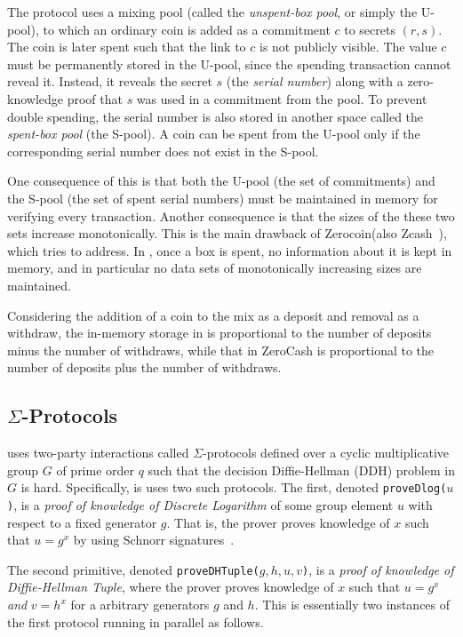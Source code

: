 \documentclass[runningheads]{llncs}
\newcommand{\zerocoin}{Zerocoin\xspace}
\begin{document}
The protocol uses a mixing pool (called the {\em unspent-box pool}, or simply the U-pool), to which an ordinary coin is added as a commitment $c$ to secrets $(r, s)$. The coin is later spent such that the link to $c$ is not publicly visible. The value $c$ must be permanently stored in the U-pool, since the spending transaction cannot reveal it. Instead, it reveals the secret $s$ (the {\em serial number}) along with a zero-knowledge proof that $s$ was used in a commitment from the pool. To prevent double spending, the serial number is also stored in another space called the {\em spent-box pool} (the S-pool). A coin can be spent from the U-pool only if the corresponding serial number does not exist in the S-pool. 

One consequence of this is that both the U-pool (the set of commitments) and the S-pool (the set of spent serial numbers) must be maintained in memory for verifying every transaction. 
Another consequence is that the sizes of the these two sets increase monotonically. 
This is the main drawback of \zerocoin (also Zcash~\cite{zcash}), which \algname tries to address. 
In \algname, once a box is spent, no information about it is kept in memory, and in particular no data sets of monotonically increasing sizes are maintained. 

Considering the addition of a coin to the mix as a deposit and removal as a withdraw, the in-memory storage in \algname is proportional to the number of deposits minus the number of withdraws, while that in ZeroCash is proportional to the number of deposits plus the number of withdraws.  

\subsection{$\Sigma$-Protocols} 

\algname uses two-party interactions called $\Sigma$-protocols defined over a cyclic multiplicative group $G$ of prime order $q$ such that the decision Diffie-Hellman (DDH) problem in $G$ is hard. Specifically, is uses two such protocols. The first, denoted \texttt{proveDlog($u$)}, is a {\em proof of knowledge of Discrete Logarithm} of some group element $u$ with respect to a fixed generator $g$. That is, the prover proves knowledge of $x$ such that $u = g^x$ by using Schnorr signatures~\cite{Sch91}. 

The second primitive, denoted \texttt{proveDHTuple($g, h, u, v$)}, is a {\em proof of knowledge of Diffie-Hellman Tuple}, where the prover proves knowledge of $x$ such that $u = g^x$ {\em and} $v = h^x$ for a arbitrary generators $g$ and $h$. This is essentially two instances of the first protocol running in parallel as follows.
\end{document}
